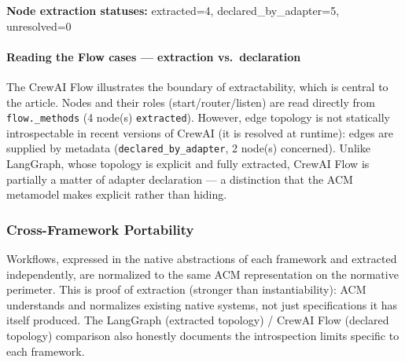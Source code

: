 \documentclass[10pt]{article}
\begin{document}
\textbf{Node extraction statuses:} extracted=4, declared\_by\_adapter=5, unresolved=0

\paragraph{Reading the Flow cases --- extraction vs.\ declaration}

The CrewAI Flow illustrates the boundary of extractability, which is central to the article. Nodes and their roles (start/router/listen) are read directly from \texttt{flow.\_methods} (4 node(s) \texttt{extracted}). However, edge topology is not statically introspectable in recent versions of CrewAI (it is resolved at runtime): edges are supplied by metadata (\texttt{declared\_by\_adapter}, 2 node(s) concerned). Unlike LangGraph, whose topology is explicit and fully extracted, CrewAI Flow is partially a matter of adapter declaration --- a distinction that the ACM metamodel makes explicit rather than hiding.

\subsubsection{Cross-Framework Portability}

Workflows, expressed in the native abstractions of each framework and extracted independently, are normalized to the same ACM representation on the normative perimeter. This is proof of extraction (stronger than instantiability): ACM understands and normalizes existing native systems, not just specifications it has itself produced. The LangGraph (extracted topology) / CrewAI Flow (declared topology) comparison also honestly documents the introspection limits specific to each framework.



\end{document}
